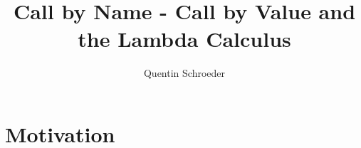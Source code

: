 \documentclass[10pt]{beamer}
\title{Call by Name - Call by Value and the Lambda Calculus}
\date{}
\author{Quentin Schroeder}
\institute{MPRI - Université Paris-Cité}
\begin{document}
\maketitle


\section[Idea]{Motivation}


\end{document}
